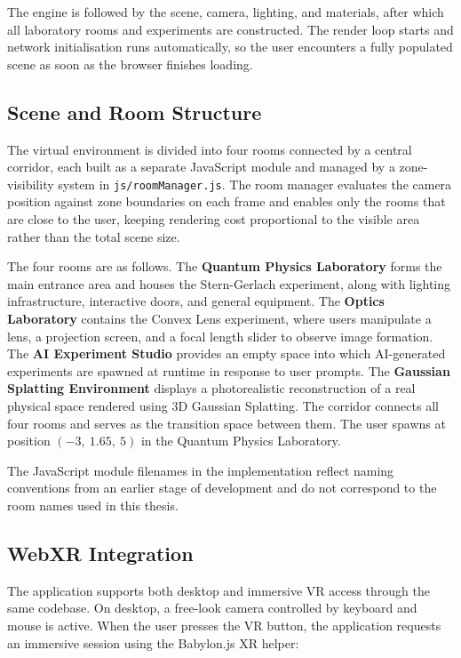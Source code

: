 The engine is followed by the scene, camera, lighting, and materials, after
which all laboratory rooms and experiments are constructed. The render loop
starts and network initialisation runs automatically, so the user encounters
a fully populated scene as soon as the browser finishes loading.

\subsection{Scene and Room Structure}
\label{sec:scene_room_structure}

The virtual environment is divided into four rooms connected by a central
corridor, each built as a separate JavaScript module and managed by a
zone-visibility system in \texttt{js/roomManager.js}. The room manager
evaluates the camera position against zone boundaries on each frame and
enables only the rooms that are close to the user, keeping rendering cost
proportional to the visible area rather than the total scene size.

The four rooms are as follows. The \textbf{Quantum Physics Laboratory}
forms the main entrance area and houses the Stern-Gerlach experiment,
along with lighting infrastructure, interactive doors, and general
equipment. The \textbf{Optics Laboratory} contains the Convex Lens
experiment, where users manipulate a lens, a projection screen, and a
focal length slider to observe image formation. The \textbf{AI Experiment
Studio} provides an empty space into which AI-generated experiments are
spawned at runtime in response to user prompts. The \textbf{Gaussian
Splatting Environment} displays a photorealistic reconstruction of a real
physical space rendered using 3D Gaussian Splatting. The corridor connects
all four rooms and serves as the transition space between them. The user
spawns at position $(-3,\ 1.65,\ 5)$ in the Quantum Physics Laboratory.

The JavaScript module filenames in the implementation reflect naming
conventions from an earlier stage of development and do not correspond to
the room names used in this thesis.

\subsection{WebXR Integration}
\label{sec:webxr_integration}

The application supports both desktop and immersive VR access through the
same codebase. On desktop, a free-look camera controlled by keyboard and
mouse is active. When the user presses the VR button, the application
requests an immersive session using the Babylon.js XR helper:

